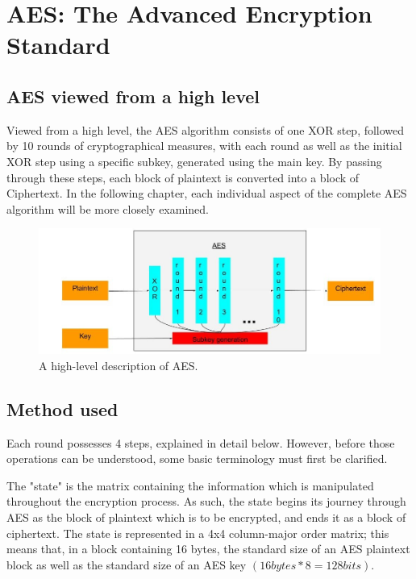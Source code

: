 \documentclass[12pt]{report}
\begin{document}
\chapter{AES: The Advanced Encryption Standard}

\section{AES viewed from a high level}

Viewed from a high level, the AES algorithm consists of one XOR step, followed by 10 rounds of cryptographical measures, with each round as well as the initial XOR step using a specific subkey, generated using the main key. By passing through these steps, each block of plaintext is converted into a block of Ciphertext. In the following chapter, each individual aspect of the complete AES algorithm will be more closely examined.

\begin{figure}[H]
\centering
\includegraphics[scale=0.4]{AES_fig1.jpg}
\caption{A high-level description of AES.}
\end{figure}

\section{Method used}
Each round possesses 4 steps, explained in detail below. However, before those operations can be understood, some basic terminology must first be clarified.

The "state" is the matrix containing the information which is manipulated throughout the encryption process. As such, the state begins its journey through AES as the block of plaintext which is to be encrypted, and ends it as a block of ciphertext. The state is represented in a 4x4 column-major order matrix; this means that, in a block containing 16 bytes, the standard size of an AES plaintext block as well as the standard size of an AES key $(16 bytes * 8 = 128 bits)$.
\end{document}
